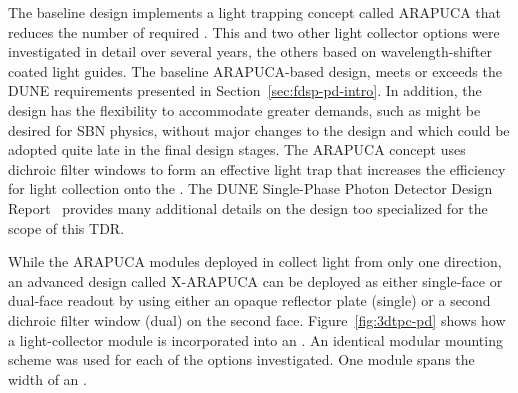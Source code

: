 


The  baseline design %
implements a light trapping concept called ARAPUCA that reduces the number of required . This and two other light collector options were investigated in detail over several years, the others %
based on %
wavelength-shifter coated light guides. 
The baseline ARAPUCA-based design,  meets or exceeds the DUNE requirements presented in Section~\ref{sec:fdsp-pd-intro}. In addition, the design has the flexibility to accommodate greater demands, such as might be desired for SBN physics, without major changes to the design and which could be adopted quite late in the final design stages.
The ARAPUCA concept uses dichroic filter windows to form an effective light trap that increases the efficiency for light collection onto the . %
 The DUNE Single-Phase Photon Detector Design Report~ provides many additional details on the design too specialized for the scope of this TDR.  
 
While the ARAPUCA modules deployed in  collect light from only one direction, an advanced design called X-ARAPUCA can be deployed as either single-face or dual-face readout by using either an opaque reflector plate (single) or a second dichroic filter window (dual) on the second face. 
Figure~\ref{fig:3dtpc-pd} shows how a light-collector module is incorporated into an . An identical modular mounting scheme was used for each of the options investigated. One module spans the width of an .

